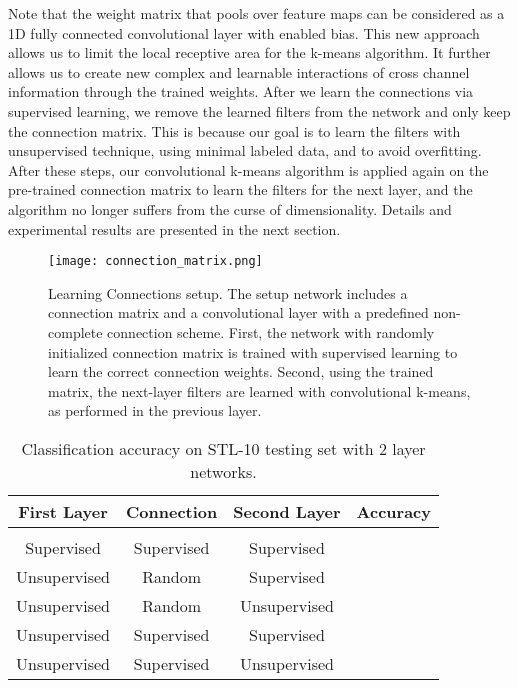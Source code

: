 \documentclass{article} \usepackage{iclr2016_workshop,times}
\begin{document}
Note that the weight matrix that pools over feature maps can be considered as a 1D fully connected convolutional layer with enabled bias.
This new approach allows us to limit the local receptive area for the k-means algorithm. It further allows us to create new complex and learnable interactions of cross channel information through the trained weights.
After we learn the connections via supervised learning, 
we remove the learned filters from the network and only keep the connection matrix. This is because our goal is to learn the filters with unsupervised technique, using minimal labeled data, and to avoid overfitting.
After these steps, our convolutional k-means algorithm is applied again on the pre-trained connection matrix to learn the filters for the next layer, and the algorithm no longer suffers from the curse of dimensionality.
Details and experimental results are presented in the next section. 

\begin{figure*}\centering
  \texttt{[image: connection\_matrix.png]}
  \caption{
    Learning Connections setup. 
    The setup network includes a connection matrix and a convolutional layer with a predefined non-complete connection scheme.  
     First, the network with randomly initialized connection matrix is trained with supervised learning to learn the correct connection weights. Second, using the trained matrix, the next-layer filters are learned with convolutional k-means, as performed in the previous layer.
  }
  \label{fig:struct}
\end{figure*}

\begin{table}[hbt!]
\caption{Classification accuracy on STL-10 testing set with 2 layer networks.}
\label{stl-experiment1}
\begin{center}
\begin{tabular}{cccc}
\multicolumn{1}{c}{\bf First Layer} &\multicolumn{1}{c}{\bf Connection} &\multicolumn{1}{c}{\bf Second Layer} &\multicolumn{1}{c}{\bf Accuracy}
\\ \hline \\
Supervised                  &Supervised               &Supervised             & \\
Unsupervised              &Random                   &Supervised             & \\
Unsupervised              &Random                   &Unsupervised         & \\
Unsupervised              &Supervised               &Supervised            & \\
Unsupervised              &Supervised               &Unsupervised        & \\

\end{tabular}
\end{center}
\end{table}
\end{document}
